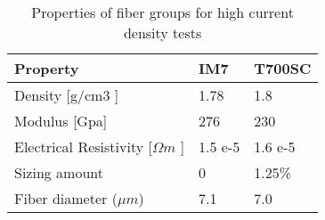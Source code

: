 \begin{table}[h]\centering
\label{Table:dry_fiber_material}
\begin{tabular}{lll}
\hline
\textbf{Property}	&\textbf{IM7}	&\textbf{T700SC}\\
\hline
Density [g/cm3 ]	&1.78	&1.8\\
Modulus [Gpa] 	&276	&230\\
Electrical Resistivity  [$\Omega m$ ]	&1.5 e-5 	&1.6 e-5  \\
Sizing amount	&0	&1.25\%\\
Fiber diameter ($\mu m$)	&7.1	&7.0\\
\hline 
\end{tabular}
\caption{Properties of fiber groups for high current density tests}

\end{table}